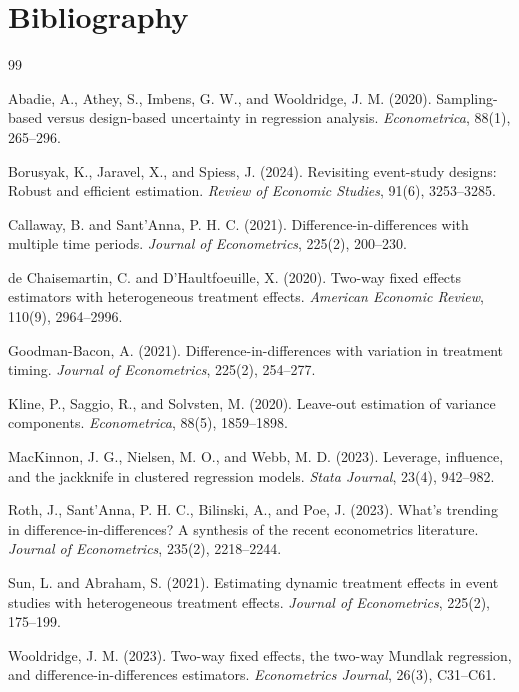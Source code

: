 \documentclass[11pt]{article}
\theoremstyle{definition}
\theoremstyle{plain}
\theoremstyle{remark}
\begin{document}
\section*{Bibliography}
\begin{thebibliography}{99}

Abadie, A., Athey, S., Imbens, G. W., and Wooldridge, J. M. (2020).
Sampling-based versus design-based uncertainty in regression analysis.
\emph{Econometrica}, 88(1), 265--296.

Borusyak, K., Jaravel, X., and Spiess, J. (2024).
Revisiting event-study designs: Robust and efficient estimation.
\emph{Review of Economic Studies}, 91(6), 3253--3285.

Callaway, B. and Sant'Anna, P. H. C. (2021).
Difference-in-differences with multiple time periods.
\emph{Journal of Econometrics}, 225(2), 200--230.

de Chaisemartin, C. and D'Haultfoeuille, X. (2020).
Two-way fixed effects estimators with heterogeneous treatment effects.
\emph{American Economic Review}, 110(9), 2964--2996.

Goodman-Bacon, A. (2021).
Difference-in-differences with variation in treatment timing.
\emph{Journal of Econometrics}, 225(2), 254--277.

Kline, P., Saggio, R., and Solvsten, M. (2020).
Leave-out estimation of variance components.
\emph{Econometrica}, 88(5), 1859--1898.

MacKinnon, J. G., Nielsen, M. O., and Webb, M. D. (2023).
Leverage, influence, and the jackknife in clustered regression models.
\emph{Stata Journal}, 23(4), 942--982.

Roth, J., Sant'Anna, P. H. C., Bilinski, A., and Poe, J. (2023).
What's trending in difference-in-differences? A synthesis of the recent econometrics literature.
\emph{Journal of Econometrics}, 235(2), 2218--2244.

Sun, L. and Abraham, S. (2021).
Estimating dynamic treatment effects in event studies with heterogeneous treatment effects.
\emph{Journal of Econometrics}, 225(2), 175--199.

Wooldridge, J. M. (2023).
Two-way fixed effects, the two-way Mundlak regression, and difference-in-differences estimators.
\emph{Econometrics Journal}, 26(3), C31--C61.

\end{thebibliography}
\end{document}
